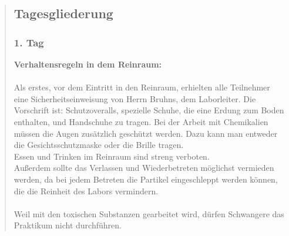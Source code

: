 \begin{quote}
            \vspace{2em}





	\subsection{Tagesgliederung}

		\subsubsection{1. Tag}


		\textbf{Verhaltensregeln in dem Reinraum:}\\
		\\
		Als erstes, vor dem Eintritt in den Reinraum, erhielten alle Teilnehmer eine
		Sicherheitseinweisung von Herrn Bruhns, dem Laborleiter. Die Vorschrift
		ist: Schutzoveralls, spezielle Schuhe, die eine Erdung zum Boden
		enthalten, und Handschuhe zu tragen. Bei der Arbeit mit Chemikalien
		müssen die Augen zusätzlich geschützt werden. Dazu kann man entweder
		die Gesichtsschutzmaske oder die Brille tragen.\\
		Essen und Trinken im Reinraum sind streng verboten.\\
 		Außerdem sollte das Verlassen und Wiederbetreten möglichst vermieden
 		werden, da bei jedem Betreten die Partikel eingeschleppt werden können,
 		die die Reinheit des Labors vermindern.\\
		\\
		Weil mit den toxischen Substanzen gearbeitet wird, dürfen
		Schwangere das Praktikum nicht durchführen.

		\vspace{2em}


\end{quote}
